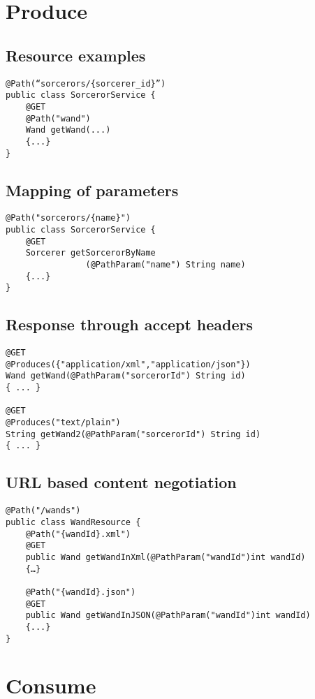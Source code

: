 
\section{Produce}

\subsection{Resource examples}

\begin{verbatim}
@Path(“sorcerors/{sorcerer_id}”)
public class SorcerorService {
	@GET
	@Path("wand")
	Wand getWand(...)
	{...}
}
\end{verbatim}

\subsection{Mapping of parameters}

\begin{verbatim}
@Path("sorcerors/{name}")
public class SorcerorService {
	@GET
	Sorcerer getSorcerorByName
				(@PathParam("name") String name)
	{...}
}
\end{verbatim}

\subsection{Response through accept headers}

\begin{verbatim}
@GET
@Produces({"application/xml","application/json"})
Wand getWand(@PathParam("sorcerorId") String id)
{ ... }

@GET
@Produces("text/plain")
String getWand2(@PathParam("sorcerorId") String id)
{ ... }
\end{verbatim}

\subsection{URL based content negotiation}

\begin{verbatim}
@Path("/wands")
public class WandResource {
	@Path("{wandId}.xml")
	@GET
	public Wand getWandInXml(@PathParam("wandId")int wandId)
	{…}

	@Path("{wandId}.json")
	@GET
	public Wand getWandInJSON(@PathParam("wandId")int wandId)
	{...}
}
\end{verbatim}

\section{Consume}


